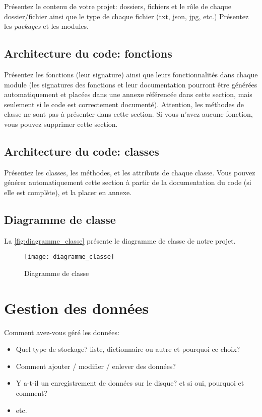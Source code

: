 \documentclass[11pt,a4paper]{article}
\begin{document}
Présentez le contenu de votre projet: dossiers, fichiers et le rôle de chaque dossier/fichier ainsi que le type de chaque fichier (txt, json, jpg, etc.)
Présentez les \emph{packages} et les modules.

\subsection{Architecture du code: fonctions}

Présentez les fonctions (leur signature) ainsi que leurs fonctionnalités dans chaque module (les signatures des fonctions et leur documentation pourront être générées automatiquement et placées dans une annexe référencée dans cette section, mais seulement si le code est correctement documenté).
Attention, les méthodes de classe ne sont pas à présenter dans cette section.
Si vous n'avez aucune fonction, vous pouvez supprimer cette section.

\subsection{Architecture du code: classes}

Présentez les classes, les méthodes, et les attributs de chaque classe.
Vous pouvez générer automatiquement cette section à partir de la documentation du code (si elle est complète), et la placer en annexe.

\subsection{Diagramme de classe}

La \autoref{fig:diagramme_classe} présente le diagramme de classe de notre projet.

\begin{figure}[tb]
  \centering
  \texttt{[image: diagramme\_classe]}
  \caption{Diagramme de classe}
  \label{fig:diagramme_classe}
\end{figure}

\section{Gestion des données}

Comment avez-vous géré les données: 
\begin{itemize}
    \item Quel type de stockage? liste, dictionnaire ou autre et pourquoi ce choix?
    \item Comment ajouter / modifier / enlever des données?
    \item Y a-t-il un enregistrement de données sur le disque? et si oui, pourquoi et comment?
    \item etc.
\end{itemize}
\end{document}
